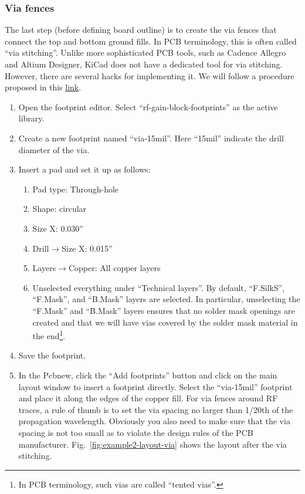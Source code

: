 \documentclass[12pt,letterpaper]{scrartcl}
\begin{document}
\subsubsection{Via fences}
The last step (before defining board outline) is to create the via fences that connect the top and bottom ground fills. In PCB terminology, this is often called ``via stitching''. Unlike more sophisticated PCB tools, such as Cadence Allegro and Altium Designer, KiCad does not have a dedicated tool for via stitching. However, there are several hacks for implementing it. We will follow a procedure proposed in this \href{https://forum.kicad.info/t/protip-nicer-via-stitching/1103/21}{link}.
	\begin{enumerate}
		\item Open the footprint editor. Select ``rf-gain-block-footprints'' as the active library. 
		
		\item Create a new footprint named ``via-15mil''. Here ``15mil'' indicate the drill diameter of the via. 
		
		\item Insert a pad and set it up as follows: 
			\begin{enumerate}
				\item Pad type: Through-hole
				\item Shape: circular
				\item Size X: 0.030''
				\item Drill$\rightarrow$Size X: 0.015''
				\item Layers$\rightarrow$Copper: All copper layers
				\item Unselected everything under ``Technical layers''. By default, ``F.SilkS'', ``F.Mask'', and ``B.Mask'' layers are selected. In particular, unselecting the ``F.Mask'' and ``B.Mask'' layers ensures that no solder mask openings are created and that we will have vias covered by the solder mask material in the end\footnote{In PCB terminology, such vias are called ``tented vias''.}.  
			\end{enumerate}
		\item Save the footprint. 
		
		\item In the Pcbnew, click the ``Add footprints'' button and click on the main layout window to insert a footprint directly. Select the ``via-15mil'' footprint and place it along the edges of the copper fill. For via fences around RF traces, a rule of thumb is to set the via spacing no larger than 1/20th of the propagation wavelength. Obviously you also need to make sure that the via spacing is not too small as to violate the design rules of the PCB manufacturer. Fig.~\ref{fig:example2-layout-via} shows the layout after the via stitching. 
		

\end{enumerate}
\end{document}
